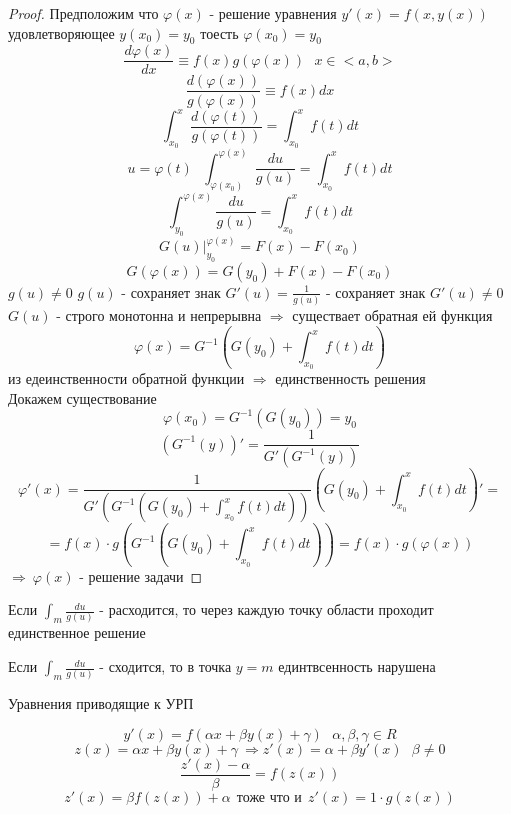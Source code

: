 \begin{proof}
  Предположим что $\varphi(x)$ - решение уравнения $y'(x) = f(x, y(x))$
  удовлетворяющее $y(x_0) = y_0$ тоесть $\varphi(x_0) = y_0$
  $$
  \frac{d\varphi(x)}{dx} \equiv f(x)g(\varphi(x)) ~~~ x \in <a, b>
  $$
  $$
  \frac{d(\varphi(x))}{g(\varphi(x))} \equiv f(x)dx
  $$
  $$
  \int_{x_0}^x \frac{d(\varphi(t))}{g(\varphi(t))} = \int_{x_0}^x f(t)dt
  $$
  $$
  u = \varphi(t) ~~~ \int_{\varphi(x_0)}^{\varphi(x)} \frac{du}{g(u)} =
  \int_{x_0}^x f(t)dt
  $$
  $$
  \int_{y_0}^{\varphi(x)} \frac{du}{g(u)} = \int_{x_0}^x f(t)dt
  $$
  $$
  G(u) |_{y_0}^{\varphi(x)} = F(x) - F(x_0)
  $$
  $$
  G(\varphi(x)) = G(y_0) + F(x) - F(x_0)
  $$
  $g(u) \not= 0$ $g(u)$ - сохраняет знак $G'(u) = \frac{1}{g(u)}$ - сохраняет
  знак $G'(u) \not= 0$ $G(u)$ - строго монотонна и непрерывна $\Rightarrow$
  существает обратная ей функция
  $$
  \varphi(x) = G^{-1} \left( G(y_0) + \int_{x_0}^x f(t)dt \right)
  $$
  из едеинственности обратной функции $\Rightarrow$ единственность решения \\

  Докажем существование
  $$
  \varphi(x_0) = G^{-1}(G(y_0)) = y_0
  $$
  $$
  (G^{-1}(y))' = \frac{1}{G'(G^{-1}(y))}
  $$
  $$
  \varphi'(x) = \frac{1}{G' \left( G^{-1} \left( G(y_0)
  + \int_{x_0}^x f(t)dt \right) \right)}
  \left( G(y_0) + \int_{x_0}^x f(t)dt \right)' =
  $$
  $$
  = f(x) \cdot g \left( G^{-1} \left( G(y_0) +
  \int_{x_0}^x f(t)dt \right) \right) = f(x) \cdot g(\varphi(x))
  $$
  $\Rightarrow ~ \varphi(x)$ - решение задачи
\end{proof}

\begin{theorem}
  Если $\int_m \frac{du}{g(u)}$ - расходится, то через каждую точку области
  проходит единственное решение

  Если $\int_m \frac{du}{g(u)}$ - сходится, то в точка $y = m$ единтвсенность
  нарушена
\end{theorem}

\begin{title}[\Large]
  Уравнения приводящие к УРП
\end{title}

\begin{block}
  $$
  y'(x) = f(\alpha x + \beta y(x) + \gamma) ~~~ \alpha, \beta, \gamma \in R
  $$
  $$
  z(x) = \alpha x + \beta y(x) + \gamma ~ \Rightarrow z'(x) = \alpha +
  \beta y'(x) ~~~ \beta \not= 0
  $$
  $$
  \frac{z'(x) - \alpha}{\beta} = f(z(x))
  $$
  $$
  z'(x) = \beta f(z(x)) + \alpha ~~ \text{тоже что и} ~~
  z'(x) = 1 \cdot g(z(x))
  $$
\end{block}

